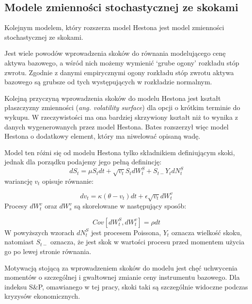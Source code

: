 \documentclass{pracamgr}
\begin{document}
\subsection{Modele zmienności stochastycznej ze skokami} %
\label{sec:modele_zmienno_ci_stochastycznej_ze_skokami}
 
Kolejnym modelem, który rozszerza model Hestona jest model zmienności stochastycznej ze skokami.

Jest wiele powodów wprowadzenia skoków do równania modelującego cenę aktywa bazowego, a wśród nich możemy wymienić `grube ogony' rozkładu stóp zwrotu. Zgodnie z danymi empirycznymi ogony rozkładu stóp zwrotu aktywa bazowego 
 są grubsze od tych występujących w rozkładzie normalnym.

Kolejną przyczyną wprowadzenia skoków do modelu Hestona jest kształt płaszczyzny zmienności 
(\textit{ang. volatility surface}) dla opcji o krótkim terminie do wykupu. W rzeczywistości ma ona bardziej 
skrzywiony kształt niż to wynika z danych wygenerowanych przez model Hestona. 
Bates \cite{Bates} rozszerzył więc model Hestona o dodatkowy element, który ma niwelować opisaną wadę.

Model ten różni się od modelu Hestona tylko składnikiem definiującym skoki, jednak dla
porządku podajemy jego pełną definincję:
\begin{equation}
dS_t  = \mu S_t dt + \sqrt{v_t} S_t dW^S_t + S_{t-} Y_t dN_t^S
\end{equation}
wariancję $v_t$ opisuje równanie: 

\begin{equation}
dv_t  = \kappa (\theta - v_t)dt + \epsilon \sqrt{v_t} dW_t^v 
\end{equation}
Procesy $dW_t^v$ oraz $dW_s^v$ są skorelowane w następujący sposób:

\begin{equation}
Cov[dW^S_t, dW^v_t] = \rho dt 
\end{equation}
W powyższych wzorach $dN_t^S$ jest procesem Poissona, $Y_t$ oznacza wielkość skoku, natomiast $S_{t-}$ oznacza, że jest 
skok w wartości procesu przed momentem użycia go po lewej stronie równania.

Motywacją stojącą za wprowadzeniem skoków do modelu jest chęć uchwycenia momentów o 
szczególnej i gwałtownej zmianie ceny instrumentu bazowego. Dla indeksu S\&P, omawianego w tej pracy,
skoki taki są szczególnie widoczne podczas kryzysów ekonomicznych. 



 
\end{document}
